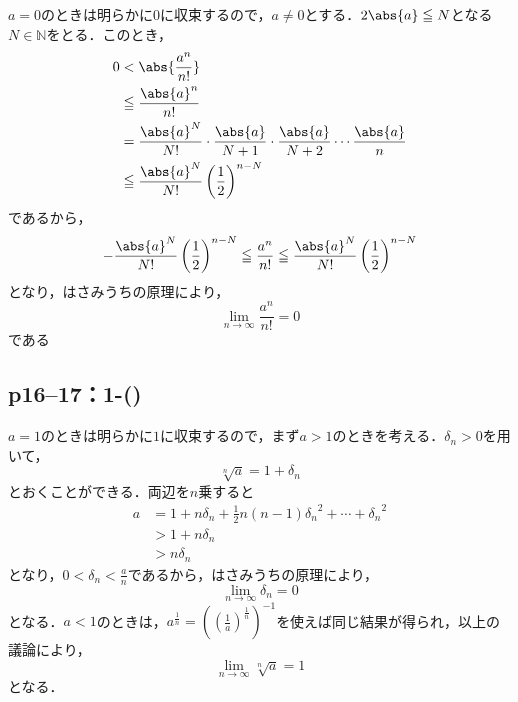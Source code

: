 \documentclass[a4paper,10pt,fleqn]{ltjsarticle}
\begin{document}
\begin{tleftbar}
    $a=0$のときは明らかに$0$に収束するので，$a \ne 0$とする．$2\abs{a} \le N$となる$N \in \mathbb{N}$をとる．このとき，
    \begin{align*}
        0 & < \abs{ \frac{a^n}{n!} }                                                                              \\
          & \le \frac{\abs{a}^n}{n!}                                                                              \\
          & = \frac{\abs{a}^{N}}{N!} \cdot \frac{\abs{a}}{N+1} \cdot \frac{\abs{a}}{N+2} \dotsm \frac{\abs{a}}{n} \\
          & \le  \frac{\abs{a}^{N}}{N!} \left(\frac{1}{2} \right)^{n-N}
    \end{align*}
    であるから，
    \[
        - \frac{\abs{a}^{N}}{N!} \left(\frac{1}{2} \right)^{n-N} \le  \frac{a^n}{n!} \le \frac{\abs{a}^{N}}{N!} \left(\frac{1}{2} \right)^{n-N}
    \]
    となり，はさみうちの原理により，
    \[
        \lim_{n \to \infty} \frac{a^n}{n!} =0
    \]
    である
\end{tleftbar}

\subsection*{p16--17：1-()}

\begin{tleftbar}
    $a=1$のときは明らかに$1$に収束するので，まず$a>1$のときを考える．$\delta_n >0$を用いて，
    \[
        \sqrt[n]{a} =1+\delta_n
    \]
    とおくことができる．両辺を$n$乗すると
    \begin{align*}
        a & = 1+ n \delta_n + \frac{1}{2}n(n-1) {\delta_n}^2 + \cdots + {\delta_n}^2 \\
          & >1+n \delta_n                                                            \\
          & >n \delta_n
    \end{align*}
    となり，$0<\delta_n <\frac{a}{n}$であるから，はさみうちの原理により，
    \[
        \lim_{n \to \infty} \delta_n =0
    \]
    となる．$a<1$のときは，$a^{\frac{1}{n}}=\left(\left(\frac{1}{a}\right)^{\frac{1}{n}}\right)^{-1}$を使えば同じ結果が得られ，以上の議論により，
    \[
        \lim_{n \to \infty} \sqrt[n]{a} =1
    \]
    となる．
\end{tleftbar}
\end{document}

